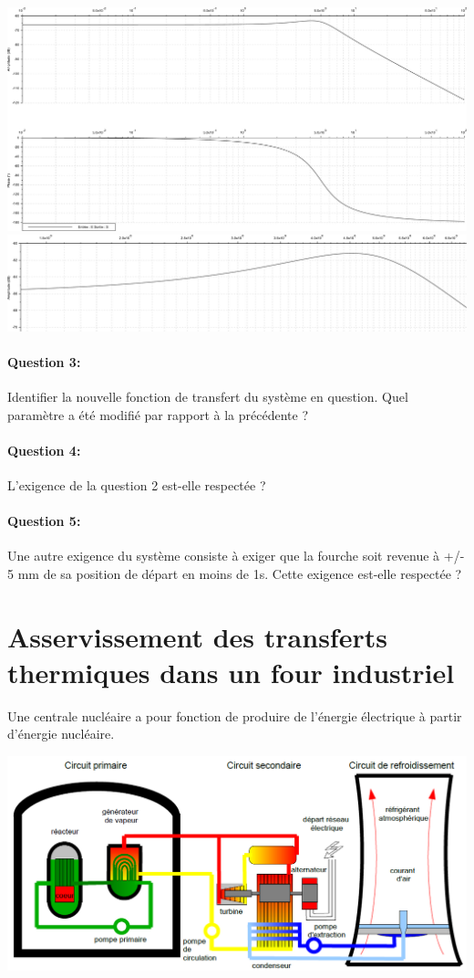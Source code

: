 \begin{center}
 \includegraphics[width=0.8\linewidth]{img/03b}
 \includegraphics[width=0.8\linewidth]{img/03b_zoom}
\end{center}

\paragraph{Question 3:} Identifier la nouvelle fonction de transfert du système en question. Quel paramètre a été modifié par rapport à la précédente ?

\paragraph{Question 4:} L'exigence de la question 2 est-elle respectée ?

\paragraph{Question 5:} Une autre exigence du système consiste à exiger que la fourche soit revenue à +/- 5 mm de sa position de départ en moins de 1s. Cette exigence est-elle respectée ?

\newpage

\section{Asservissement des transferts thermiques dans un four industriel}

Une centrale nucléaire a pour fonction de produire de l'énergie électrique à partir d'énergie nucléaire.

\begin{center}
 \includegraphics[width=0.8\linewidth]{img/fig3}
\end{center}

